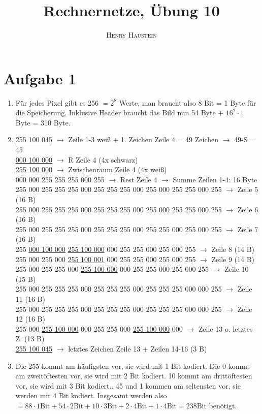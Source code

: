 \documentclass{article}
\title{\textbf{Rechnernetze, Übung 10}}
\author{\textsc{Henry Haustein}}
\date{}
\begin{document}
	\maketitle
	
	\section*{Aufgabe 1}
	\begin{enumerate}[label=(\alph*)]
		\item Für jedes Pixel gibt es 256 $=2^8$ Werte, man braucht also 8 Bit = 1 Byte für die Speicherung. Inklusive Header braucht das Bild nun 54 Byte + $16^2\cdot 1$ Byte = 310 Byte.
		\item \underline{255 100 045} $\to$ Zeile 1-3 weiß + 1. Zeichen Zeile 4 = 49 Zeichen $\to$ 49-S = 45 \\
		\underline{000 100 000} $\to$ R Zeile 4 (4x schwarz) \\
		\underline{255 100 000} $\to$ Zwischenraum Zeile 4 (4x weiß) \\
		000 000 255 255 255 000 255 $\to$ Rest Zeile 4 $\to$ Summe Zeilen 1-4: 16 Byte \\
		255 000 255 255 255 000 255 255 255 000 255 000 255 255 000 255 $\to$ Zeile 5 (16 B) \\
		255 000 255 255 255 000 255 255 255 000 255 000 255 255 000 255 $\to$ Zeile 6 (16 B) \\
		255 000 255 255 255 000 255 255 255 000 255 255 000 255 000 255 $\to$ Zeile 7 (16 B) \\
		255 \underline{000 100 000} \underline{255 100 000} 000 255 255 000 255 000 255 $\to$ Zeile 8 (14 B) \\
		255 000 255 000 \underline{255 100 001} 000 255 255 000 255 000 255 $\to$ Zeile 9 (14 B) \\
		255 000 255 255 000 \underline{255 100 000} 000 255 255 000 255 000 255 $\to$ Zeile 10 (15 B) \\
		255 000 255 255 255 000 255 255 255 000 255 255 255 000 000 255 $\to$ Zeile 11 (16 B) \\
		255 000 255 255 255 000 255 255 255 000 255 255 255 000 000 255 $\to$ Zeile 12 (16 B) \\
		255 000 \underline{255 100 000} 000 255 255 000 \underline{255 100 000} 000 $\to$ Zeile 13 o. letztes Z. (13 B) \\
		\underline{255 100 045} $\to$ letztes Zeichen Zeile 13 + Zeilen 14-16 (3 B)
		\item Die 255 kommt am häufigsten vor, sie wird mit 1 Bit kodiert. Die 0 kommt am zweitöftesten vor, sie wird mit 2 Bit kodiert. 10 kommt am drittöftesten vor, sie wird mit 3 Bit kodiert.. 45 und 1 kommen am seltensten vor, sie werden mit 4 Bit kodiert. Insgesamt werden also $= 88 \cdot 1 \text{Bit} + 54 \cdot 2 \text{Bit} + 10 \cdot 3 \text{Bit} + 2 \cdot 4 \text{Bit} + 1 \cdot 4 \text{Bit}= 238 \text{Bit}$ benötigt.
	\end{enumerate}
\end{document}

